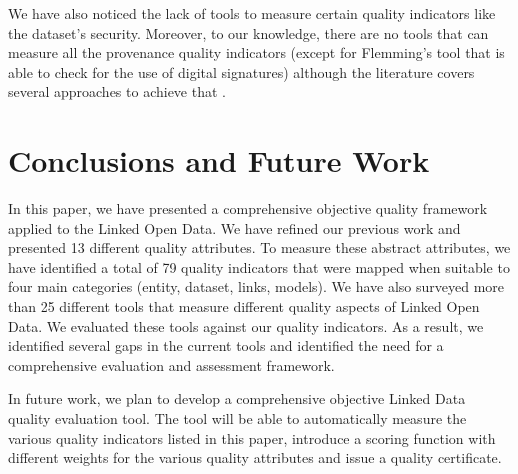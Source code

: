 \documentclass[onecolumn, crcready]{iosart2c}
\begin{document}
We have also noticed the lack of tools to measure certain quality indicators like the dataset's security. Moreover, to our knowledge, there are no tools that can measure all the provenance quality indicators (except for Flemming's tool that is able to check for the use of digital signatures) although the literature covers several approaches to achieve that \cite{Hartig09usingweb}\cite{Flouris2012}\cite{Harth2009}. \\

\section{Conclusions and Future Work}

In this paper, we have presented a comprehensive objective quality framework applied to the Linked Open Data. We have refined our previous work and presented 13 different quality attributes. To measure these abstract attributes, we have identified a total of 79 quality indicators that were mapped when suitable to four main categories (entity, dataset, links, models). 
We have also surveyed more than 25 different tools that measure different quality aspects of Linked Open Data. We evaluated these tools against our quality indicators. As a result, we identified several gaps in the current tools and identified the need for a comprehensive evaluation and assessment framework. 

In future work, we plan to develop a comprehensive objective Linked Data quality evaluation tool. The tool will be able to automatically measure the various quality indicators listed in this paper, introduce a scoring function with different weights for the various quality attributes and issue a quality certificate.



\end{document}
